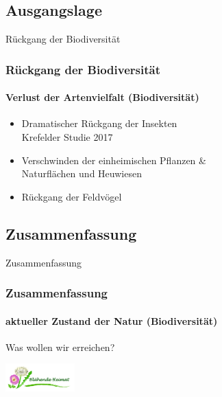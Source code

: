 \documentclass[aspectratio=43]{beamer}
\begin{document}
\subsection[Ausgangslage]{Ausgangslage}
\begin{frame}{Rückgang der Biodiversität}
    \frametitle{Rückgang der Biodiversität} 
    \framesubtitle{Verlust der Artenvielfalt (Biodiversität)}
    \begin{itemize} 
        \item 
            Dramatischer Rückgang der Insekten	\\
            Krefelder Studie 2017 \pause
        \item 
            Verschwinden der einheimischen Pflanzen \& \\
             Naturflächen und Heuwiesen\pause
        \item 
            Rückgang der Feldvögel \pause
    \end{itemize}

 
    \end{frame}


\subsection[Summary]{Zusammenfassung}

\begin{frame}{Zusammenfassung}
\frametitle{Zusammenfassung} 
\framesubtitle{aktueller Zustand der Natur (Biodiversität)}

\begin{block}{Was wollen wir erreichen?}
\begin{center}	
    \includegraphics[width=0.2\textwidth]{figures/BH-Logo.png}
\end{center}
\end{block}
\end{frame}
\end{document}

